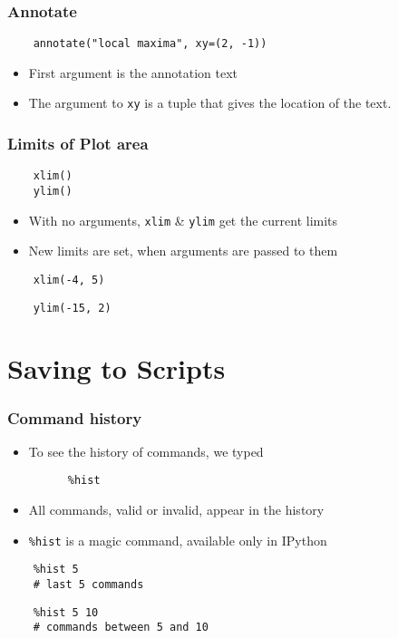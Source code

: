\begin{frame}[fragile]
  \frametitle{Annotate}
  \begin{lstlisting}
    annotate("local maxima", xy=(2, -1))
  \end{lstlisting}
  \begin{itemize}
  \item First argument is the annotation text
  \item The argument to \texttt{xy} is a tuple that gives the location
    of the text. 
  \end{itemize}
\end{frame}

\begin{frame}[fragile]
  \frametitle{Limits of Plot area}
  \begin{lstlisting}
    xlim()
    ylim()
  \end{lstlisting}
  \begin{itemize}
  \item With no arguments, \texttt{xlim} \& \texttt{ylim} get the
    current limits
  \item New limits are set, when arguments are passed to them
  \end{itemize}
  \begin{lstlisting}
    xlim(-4, 5)
  \end{lstlisting}
  \begin{lstlisting}
    ylim(-15, 2)
  \end{lstlisting}
\end{frame}

\section{Saving to Scripts}

\begin{frame}[fragile]
  \frametitle{Command history}
  \begin{itemize}
  \item To see the history of commands, we typed
    \begin{lstlisting}
      %hist
    \end{lstlisting}
  \item All commands, valid or invalid, appear in the history
  \item \texttt{\%hist} is a magic command, available only in IPython
  \end{itemize}
  \begin{lstlisting}
    %hist 5
    # last 5 commands
  \end{lstlisting}
  \begin{lstlisting}
    %hist 5 10
    # commands between 5 and 10
  \end{lstlisting}
\end{frame}

